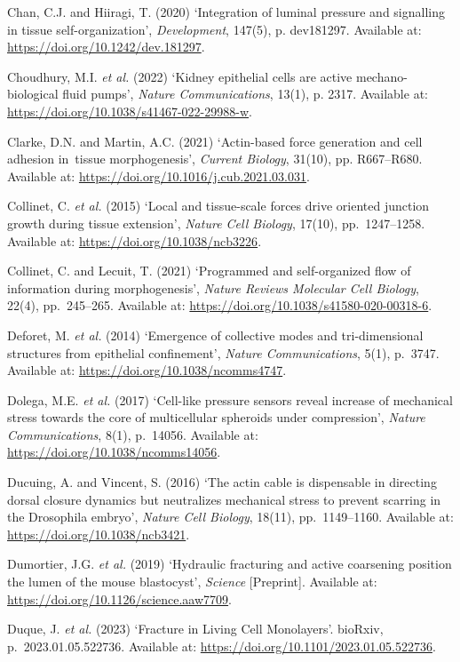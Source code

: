 \documentclass[
]{article}
\begin{document}
Chan, C.J. and Hiiragi, T. (2020) `Integration of luminal pressure and
signalling in tissue self-organization', \emph{Development}, 147(5), p.
dev181297. Available at: \url{https://doi.org/10.1242/dev.181297}.

Choudhury, M.I. \emph{et al.} (2022) `Kidney epithelial cells are active
mechano-biological fluid pumps', \emph{Nature Communications}, 13(1), p.
2317. Available at: \url{https://doi.org/10.1038/s41467-022-29988-w}.

Clarke, D.N. and Martin, A.C. (2021) `Actin-based force generation and
cell adhesion in~tissue morphogenesis', \emph{Current Biology}, 31(10),
pp. R667--R680. Available at:
\url{https://doi.org/10.1016/j.cub.2021.03.031}.

Collinet, C. \emph{et al.} (2015) `Local and tissue-scale forces drive
oriented junction growth during tissue extension', \emph{Nature Cell
Biology}, 17(10), pp.~1247--1258. Available at:
\url{https://doi.org/10.1038/ncb3226}.

Collinet, C. and Lecuit, T. (2021) `Programmed and self-organized flow
of information during morphogenesis', \emph{Nature Reviews Molecular
Cell Biology}, 22(4), pp.~245--265. Available at:
\url{https://doi.org/10.1038/s41580-020-00318-6}.

Deforet, M. \emph{et al.} (2014) `Emergence of collective modes and
tri-dimensional structures from epithelial confinement', \emph{Nature
Communications}, 5(1), p.~3747. Available at:
\url{https://doi.org/10.1038/ncomms4747}.

Dolega, M.E. \emph{et al.} (2017) `Cell-like pressure sensors reveal
increase of mechanical stress towards the core of multicellular
spheroids under compression', \emph{Nature Communications}, 8(1),
p.~14056. Available at: \url{https://doi.org/10.1038/ncomms14056}.

Ducuing, A. and Vincent, S. (2016) `The actin cable is dispensable in
directing dorsal closure dynamics but neutralizes mechanical stress to
prevent scarring in the Drosophila embryo', \emph{Nature Cell Biology},
18(11), pp.~1149--1160. Available at:
\url{https://doi.org/10.1038/ncb3421}.

Dumortier, J.G. \emph{et al.} (2019) `Hydraulic fracturing and active
coarsening position the lumen of the mouse blastocyst', \emph{Science}
{[}Preprint{]}. Available at:
\url{https://doi.org/10.1126/science.aaw7709}.

Duque, J. \emph{et al.} (2023) `Fracture in Living Cell Monolayers'.
bioRxiv, p.~2023.01.05.522736. Available at:
\url{https://doi.org/10.1101/2023.01.05.522736}.
\end{document}
